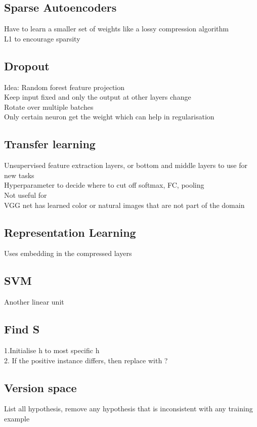\documentclass[11pt]{article}
\begin{document}
\subsection*{Sparse Autoencoders}
Have to learn a smaller set of weights like a lossy compression algorithm \\
L1 to encourage sparsity
\subsection*{Dropout}
Idea: Random forest feature projection\\
Keep input fixed and only the output at other layers change\\
Rotate over multiple batches\\
Only certain neuron get the weight which can help in regularisation
\subsection*{Transfer learning}
Unsupervised feature extraction layers, or bottom and middle layers to use for new tasks\\
Hyperparameter to decide where to cut off softmax, FC, pooling
\\
Not useful for\\
VGG net has learned color or natural images that are not part of the domain
\subsection*{Representation Learning}
Uses embedding in the compressed layers
\subsection*{SVM}
Another linear unit
\newpage\noindent
\subsection*{Find S}
1.Initialise h to most specific h\\
2. If the positive instance differs, then replace with ?
\subsection*{Version space}
List all hypothesis, remove any hypothesis that is inconsistent with any training example
\end{document}
